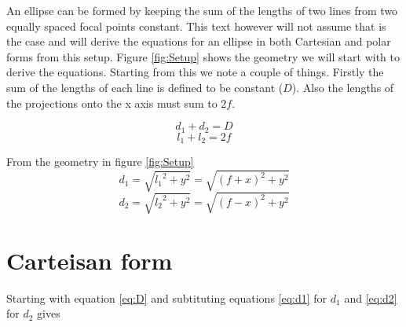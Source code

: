 \documentclass[a5paper,12pt]{article}
\begin{document}
An ellipse can be formed by keeping the sum of the lengths of two lines from two equally spaced focal points constant. This text however will not assume that is the case and will derive the equations for an ellipse in both Cartesian and polar forms from this setup. Figure \ref{fig:Setup} shows the geometry we will start with to derive the equations.
Starting from this we note a couple of things. Firstly the sum of the lengths of each line is defined to be constant ($D$). Also the lengths of the projections onto the x axis must sum to $2f$.
\begin{framed}
\begin{equation}\label{eq:D}
d_1+d_2=D
\end{equation}
\begin{equation}\label{eq:f}
l_1+l_2=2f
\end{equation}
\end{framed}

From the geometry in figure \ref{fig:Setup}
\begin{equation}\label{eq:d1}
d_1=\sqrt{{l_1}^2+y^2}=\sqrt{(f+x)^2+y^2}
\end{equation}
\begin{equation}\label{eq:d2}
d_2=\sqrt{{l_2}^2+y^2}=\sqrt{(f-x)^2+y^2}
\end{equation}

\section{Carteisan form}

Starting with equation \ref{eq:D} and subtituting equations \ref{eq:d1} for $d_1$ and \ref{eq:d2} for $d_2$ gives
\end{document}
